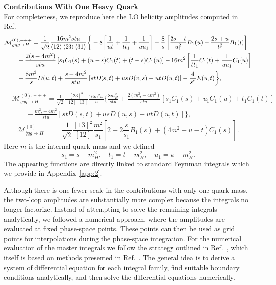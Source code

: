\textbf{Contributions With One Heavy Quark} \\
For completeness, we reproduce here the \acs{LO} helicity amplitudes computed in Ref.~\cite{Baur:1989cm}
\begin{equation}
\begin{split}
& \mathcal{M}_{ggg \rightarrow H}^{(0), +++} = \frac{1}{\sqrt{2}} \frac{16 m^2 stu}{\braket{12}\braket{23}\braket{31}} \bigg \lbrace - 8 \left[ \frac{1}{u t} + \frac{1}{t t_1} + \frac{1}{u u_1} \right] - \frac{8}{s} \left[ \frac{2 s + t}{u_1^2} B_1(u) + \frac{2 s + u}{t_1^2} B_1(t) \right] \\
& \qquad - \frac{2 (s - 4 m^2)}{stu} \left[ s_1 C_1(s) + (u - s) C_1(t) + (t - s) C_1(u) \right] - 16 m^2 \left[ \frac{1}{t t_1} C_1(t) + \frac{1}{u u_1} C_1(u) \right] \\
& \qquad + \frac{8 m^2}{s} D(u, t) + \frac{s - 4 m^2}{s t u} \left[ s t D(s, t) + u s D(u, s) - u t D(u, t) \right] - \frac{4}{s^2} E(u, t) \bigg \rbrace,
\end{split}
\end{equation}
%
%
\begin{equation}
\begin{split}
& \mathcal{M}_{ggg \rightarrow H}^{(0), -++} = \frac{1}{\sqrt{2}} \frac{[23]^3}{[12][13]} \frac{16 m^2 s t}{u} \bigg \lbrace \frac{8 m_H^2}{s t u} + \frac{2 (m_H^2 - 4 m^2)}{stu} \left[ s_1 C_1(s) + u_1 C_1(u) + t_1 C_1(t) \right] \\
&\qquad - \frac{m_H^2 - 4 m^2}{stu} \left[ s t D(s, t) + u s D(u, s) + u t D(u, t) \right] \bigg \rbrace,
\end{split}
\end{equation}
%
%
\begin{equation}
\mathcal{M}_{\bar{q} qg \rightarrow H}^{(0), -++} = \frac{1}{\sqrt{2}} \frac{[13]^2}{[12]} \frac{m^2}{s_1} \left[ 2 + 2 \frac{s}{s_1} B_1(s) + \left(4 m^2 - u - t \right) C_1(s) \right].
\end{equation}
Here $m$ is the internal quark mass and we defined
\begin{equation}
s_1 = s - m_H^2, \quad t_1 = t - m_H^2, \quad u_1 = u - m_H^2.
\end{equation}
The appearing functions are directly linked to standard Feynman integrals which we provide in Appendix~\ref{app:2}.

Although there is one fewer scale in the contributions with only one quark mass, the two-loop amplitudes are substantially more complex because the integrals no longer factorize. Instead of attempting to solve the remaining integrals analytically, we followed a numerical approach, where the amplitudes are evaluated at fixed phase-space points. These points can then be used as grid points for interpolations during the phase-space integration. For the numerical evaluation of the master integrals we follow the strategy outlined in Ref.~\cite{Czakon:2021yub}, which itself is based on methods presented in Ref.~\cite{Czakon:2015exa}. The general idea is to derive a system of differential equation for each integral family, find suitable boundary conditions analytically, and then solve the differential equations numerically.

